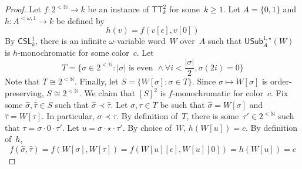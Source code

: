 \documentclass[10pt,a4paper]{amsart}
\newcommand{\CSL}{\mathsf{CSL}}
\newcommand{\NN}{\mathbb{N}}
\newcommand{\TT}{\mathsf{TT}}
\newcommand{\USub}{\mathsf{USub}}
\newcommand{\bstr}{2^{<\NN}}
\begin{document}
\begin{proof}
Let $f : \bstr \to k$ be an instance of $\TT^2_k$ for some~$k \geq 1$.
Let $A = \{0,1\}$ and $h : A^{<\omega, 1} \to k$ be defined by
$$h(v) = f(v[\epsilon], v[0])$$
By $\CSL^1_k$, there is an infinite $\omega$-variable word~$W$ over~$A$ such that
$\USub^{1,\star}_A(W)$ is $h$-monochromatic for some color~$c$. Let 
$$T = \{ \sigma \in \bstr : |\sigma| \text{ is even } \wedge \forall i < \frac{|\sigma|}{2}, \sigma(2i) = 0 \}$$
Note that $T \cong \bstr$.
Finally, let $S = \{ W[\sigma] : \sigma \in T \}$.
Since $\sigma \mapsto W[\sigma]$ is order-preserving, $S \cong \bstr$.
We claim that $[S]^2$ is $f$-monochromatic for color~$c$.
Fix some $\hat \sigma, \hat \tau \in S$ such that $\hat \sigma \prec \hat \tau$.
Let $\sigma, \tau \in T$ be such that $\hat \sigma = W[\sigma]$ and $\hat \tau = W[\tau]$. In particular, $\sigma \prec \tau$. By definition of~$T$, there is some~$\tau' \in \bstr$ such that $\tau = \sigma \cdot 0 \cdot \tau'$.
Let $u = \sigma \cdot \star \cdot \tau'$. By choice of~$W$, $h(W[u]) = c$.
By definition of~$h$, $$f(\hat \sigma, \hat \tau) = f(W[\sigma], W[\tau]) = f(W[u][\epsilon], W[u][0]) = h(W[u]) = c$$
\end{proof}
\end{document}
